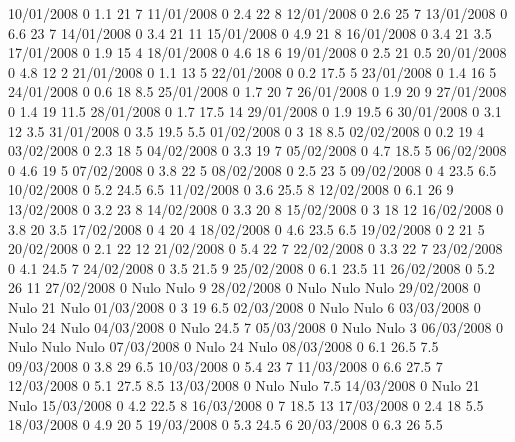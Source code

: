 10/01/2008  0      1.1    21     7 
11/01/2008  0      2.4    22     8 
12/01/2008  0      2.6    25     7 
13/01/2008  0      6.6    23     7 
14/01/2008  0      3.4    21     11 
15/01/2008  0      4.9    21     8 
16/01/2008  0      3.4    21     3.5 
17/01/2008  0      1.9    15     4 
18/01/2008  0      4.6    18     6 
19/01/2008  0      2.5    21     0.5 
20/01/2008  0      4.8    12     2 
21/01/2008  0      1.1    13     5 
22/01/2008  0      0.2    17.5   5 
23/01/2008  0      1.4    16     5 
24/01/2008  0      0.6    18     8.5 
25/01/2008  0      1.7    20     7 
26/01/2008  0      1.9    20     9 
27/01/2008  0      1.4    19     11.5 
28/01/2008  0      1.7    17.5   14 
29/01/2008  0      1.9    19.5   6 
30/01/2008  0      3.1    12     3.5 
31/01/2008  0      3.5    19.5   5.5 
01/02/2008  0      3      18     8.5 
02/02/2008  0      0.2    19     4 
03/02/2008  0      2.3    18     5 
04/02/2008  0      3.3    19     7 
05/02/2008  0      4.7    18.5   5 
06/02/2008  0      4.6    19     5 
07/02/2008  0      3.8    22     5 
08/02/2008  0      2.5    23     5 
09/02/2008  0      4      23.5   6.5 
10/02/2008  0      5.2    24.5   6.5 
11/02/2008  0      3.6    25.5   8 
12/02/2008  0      6.1    26     9 
13/02/2008  0      3.2    23     8 
14/02/2008  0      3.3    20     8 
15/02/2008  0      3      18     12 
16/02/2008  0      3.8    20     3.5 
17/02/2008  0      4      20     4 
18/02/2008  0      4.6    23.5   6.5 
19/02/2008  0      2      21     5 
20/02/2008  0      2.1    22     12 
21/02/2008  0      5.4    22     7 
22/02/2008  0      3.3    22     7 
23/02/2008  0      4.1    24.5   7 
24/02/2008  0      3.5    21.5   9 
25/02/2008  0      6.1    23.5   11 
26/02/2008  0      5.2    26     11 
27/02/2008  0     Nulo   Nulo    9 
28/02/2008  0     Nulo   Nulo   Nulo
29/02/2008  0     Nulo    21    Nulo
01/03/2008  0      3      19     6.5 
02/03/2008  0     Nulo   Nulo    6 
03/03/2008  0     Nulo    24    Nulo
04/03/2008  0     Nulo    24.5   7 
05/03/2008  0     Nulo   Nulo    3 
06/03/2008  0     Nulo   Nulo   Nulo
07/03/2008  0     Nulo    24    Nulo
08/03/2008  0      6.1    26.5   7.5 
09/03/2008  0      3.8    29     6.5 
10/03/2008  0      5.4    23     7 
11/03/2008  0      6.6    27.5   7 
12/03/2008  0      5.1    27.5   8.5 
13/03/2008  0     Nulo   Nulo    7.5 
14/03/2008  0     Nulo    21    Nulo
15/03/2008  0      4.2    22.5   8 
16/03/2008  0      7      18.5   13 
17/03/2008  0      2.4    18     5.5 
18/03/2008  0      4.9    20     5 
19/03/2008  0      5.3    24.5   6 
20/03/2008  0      6.3    26     5.5 
